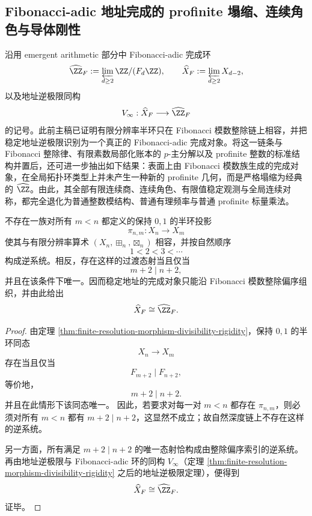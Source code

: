 \subsection{Fibonacci-adic 地址完成的 profinite 塌缩、连续角色与导体刚性}\label{subsec:conclusion-fibadic-profinite-collapse-character-conductor-rigidity}
沿用 emergent arithmetic 部分中 Fibonacci-adic 完成环
\[
\widehat{\ZZ}_F:=\varprojlim_{d\ge 2}\ZZ/(F_d\ZZ),
\qquad
\widehat X_F:=\varprojlim_{d\ge 2}X_{d-2},
\]
以及地址逆极限同构
\[
V_\infty:\widehat X_F\longrightarrow \widehat{\ZZ}_F
\]
的记号。此前主稿已证明有限分辨率半环只在 Fibonacci 模数整除链上相容，并把稳定地址逆极限识别为一个真正的 Fibonacci-adic 完成对象。将这一链条与 Fibonacci 整除律、有限素数局部化账本的 \(p\)-主分解以及 profinite 整数的标准结构并置后，还可进一步抽出如下结果：表面上由 Fibonacci 模数族生成的完成对象，在全局拓扑环类型上并未产生一种新的 profinite 几何，而是严格塌缩为经典的 \(\widehat{\ZZ}\)。由此，其全部有限连续商、连续角色、有限值稳定观测与全局连续对称，都完全退化为普通整数模结构、普通有理频率与普通 profinite 标量乘法。

\begin{theorem}[稳定地址完成的非链性]\label{thm:conclusion-fibadic-natural-depth-chain-obstruction}
不存在一族对所有 \(m<n\) 都定义的保持 \(0,1\) 的半环投影
\[
\pi_{n,m}:X_n\longrightarrow X_m
\]
使其与有限分辨率算术 \((X_n,\boxplus_n,\boxtimes_n)\) 相容，并按自然顺序
\[
1<2<3<\cdots
\]
构成逆系统。相反，存在这样的过渡态射当且仅当
\[
m+2\mid n+2,
\]
并且在该条件下唯一。因而稳定地址的完成对象只能沿 Fibonacci 模数整除偏序组织，并由此给出
\[
\widehat X_F\cong \widehat{\ZZ}_F.
\]
\end{theorem}
\begin{proof}
由定理 \ref{thm:finite-resolution-morphism-divisibility-rigidity}，保持 \(0,1\) 的半环同态
\[
X_n\longrightarrow X_m
\]
存在当且仅当
\[
F_{m+2}\mid F_{n+2},
\]
等价地，
\[
m+2\mid n+2.
\]
并且在此情形下该同态唯一。
因此，若要求对每一对 \(m<n\) 都存在 \(\pi_{n,m}\)，则必须对所有 \(m<n\) 都有 \(m+2\mid n+2\)，这显然不成立；故自然深度链上不存在这样的逆系统。

另一方面，所有满足 \(m+2\mid n+2\) 的唯一态射恰构成由整除偏序索引的逆系统。再由地址逆极限与 Fibonacci-adic 环的同构 \(V_\infty\)（定理 \ref{thm:finite-resolution-morphism-divisibility-rigidity} 之后的地址逆极限定理），便得到
\[
\widehat X_F\cong \widehat{\ZZ}_F.
\]
证毕。
\end{proof}

